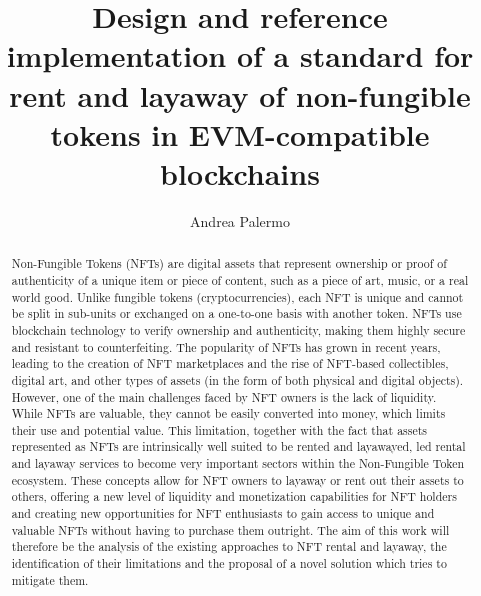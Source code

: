 \documentclass[english, LaM, oneside]{sapthesis}%
\title{Design and reference implementation of a standard for rent and layaway of non-fungible tokens in EVM-compatible blockchains}
\author{Andrea Palermo}
\begin{document}
\frontmatter
\maketitle
\begin{abstract}
\label{chap:abs}
Non-Fungible Tokens (NFTs)\cite{ref:nfts} are digital assets that represent ownership or proof of authenticity of a unique item or piece of content, such as a piece of art, music, or a real world good. Unlike fungible tokens (cryptocurrencies), each NFT is unique and cannot be split in sub-units or exchanged on a one-to-one basis with another token. NFTs use blockchain technology to verify ownership and authenticity, making them highly secure and resistant to counterfeiting. The popularity of NFTs has grown in recent years, leading to the creation of NFT marketplaces and the rise of NFT-based collectibles, digital art, and other types of assets (in the form of both physical and digital objects). However, one of the main challenges faced by NFT owners is the lack of liquidity. While NFTs are valuable, they cannot be easily converted into money, which limits their use and potential value.\newline 
This limitation, together with the fact that assets represented as NFTs are intrinsically well suited to be rented and layawayed, led rental and layaway services to become very important sectors within the Non-Fungible Token ecosystem. These concepts allow for NFT owners to layaway or rent out their assets to others, offering a new level of liquidity and monetization capabilities for NFT holders and creating new opportunities for NFT enthusiasts to gain access to unique and valuable NFTs without having to purchase them outright.\newline 
The aim of this work will therefore be the analysis of the existing approaches to NFT rental and layaway, the identification of their limitations and the proposal of a novel solution which tries to mitigate them.
\end{abstract}

\tableofcontents

\mainmatter
\end{document}

